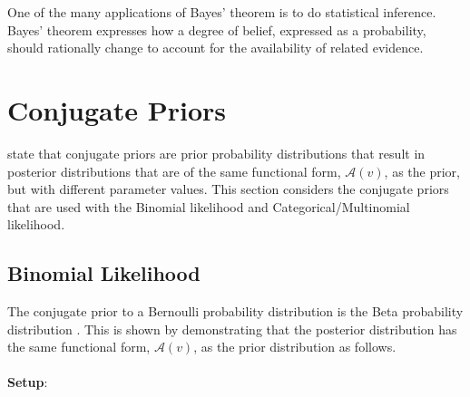 One of the many applications of Bayes' theorem is to do statistical inference. Bayes' theorem expresses how a degree of belief, expressed as a probability, should rationally change to account for the availability of related evidence.



\section{Conjugate Priors}\label{sec:probability:conjugate_priors}

\citeauthor{ref:wackerly:2014}\cite{ref:wackerly:2014} state that conjugate priors are prior probability distributions that result in posterior distributions that are of the same functional form, $\mathcal{A}(v)$, as the prior, but with different parameter values. This section considers the conjugate priors that are used with the Binomial likelihood and Categorical/Multinomial likelihood.

\subsection{Binomial Likelihood}\label{sec:probability:conjugate_priors:binom_likelihood}

The conjugate prior to a Bernoulli probability distribution is the Beta probability distribution
\cite{ref:wackerly:2014}. This is shown by demonstrating that the posterior distribution has the
same functional form, $\mathcal{A}(v)$, as the prior distribution as follows. \\\\
\textbf{Setup}:

